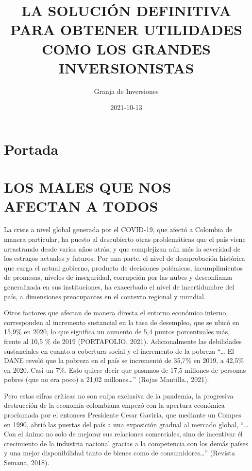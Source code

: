\documentclass[
]{book}
\title{LA SOLUCIÓN DEFINITIVA PARA OBTENER UTILIDADES COMO LOS GRANDES INVERSIONISTAS}
\author{Granja de Inversiones}
\date{2021-10-13}
\begin{document}
\maketitle

{
\setcounter{tocdepth}{1}
\tableofcontents
}
\hypertarget{portada}{%
\chapter*{Portada}\label{portada}}

\hypertarget{los-males-que-nos-afectan-a-todos}{%
\chapter{LOS MALES QUE NOS AFECTAN A TODOS}\label{los-males-que-nos-afectan-a-todos}}

La crisis a nivel global generada por el COVID-19, que afectó a Colombia de manera particular, ha puesto al descubierto otras problemáticas que el país viene arrastrando desde varios años atrás, y que complejizan aún más la severidad de los estragos actuales y futuros. Por una parte, el nivel de desaprobación histórica que carga el actual gobierno, producto de decisiones polémicas, incumplimientos de promesas, niveles de inseguridad, corrupción por las nubes y desconfianza generalizada en sus instituciones, ha exacerbado el nivel de incertidumbre del país, a dimensiones preocupantes en el contexto regional y mundial.

Otros factores que afectan de manera directa el entorno económico interno, corresponden al incremento sustancial en la tasa de desempleo, que se ubicó en 15,9\% en 2020, lo que significa un aumento de 5,4 puntos porcentuales más, frente al 10,5 \% de 2019 (PORTAFOLIO, 2021). Adicionalmente las debilidades sustanciales en cuanto a cobertura social y el incremento de la pobreza ``\ldots{} El DANE reveló que la pobreza en el país se incrementó de 35,7\% en 2019, a 42,5\% en 2020. Casi un 7\%. Esto quiere decir que pasamos de 17,5 millones de personas pobres (que no era poco) a 21,02 millones\ldots{}'' (Rojas Mantilla., 2021).

Pero estas cifras críticas no son culpa exclusiva de la pandemia, la progresiva destrucción de la economía colombiana empezó con la apertura económica proclamada por el entonces Presidente Cesar Gaviria, que mediante un Compes en 1990, abrió las puertas del país a una exposición gradual al mercado global, ``\ldots{} Con el ánimo no solo de mejorar sus relaciones comerciales, sino de incentivar él crecimiento de la industria nacional gracias a la competencia con los demás países y una mejor disponibilidad tanto de bienes como de consumidores\ldots{}'' (Revista Semana, 2018).
\end{document}
